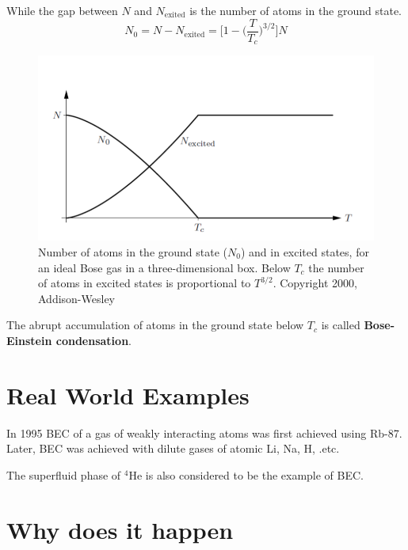 While the gap between $N$ and $N_\textrm{exited}$ is the number of atoms in the ground state.
\begin{equation}
    N_0 = N-N_\textrm{exited} = \bigg[1-\bigg(\frac{T}{T_c}\bigg)^{3/2}\bigg]N
\end{equation}

\begin{figure}[ht]
\centering
\includegraphics[width=0.8\linewidth]{imgs/BEC2.png}
\caption{Number of atoms in the ground state ($N_0$) and in excited states,
for an ideal Bose gas in a three-dimensional box. Below $T_c$ the number of atoms in excited states is proportional to $T^{3/2}$. Copyright 2000, Addison-Wesley}
\end{figure}

The abrupt accumulation of atoms in the ground state below $T_c$ is called \textbf{Bose-Einstein condensation}.

\section{Real World Examples}
In 1995 BEC of a gas of weakly interacting atoms was first achieved using Rb-87. Later, BEC was achieved with dilute gases of atomic Li, Na, H, .etc.

The superfluid phase of $^4$He is also considered to be the example of BEC.

\section{Why does it happen}




